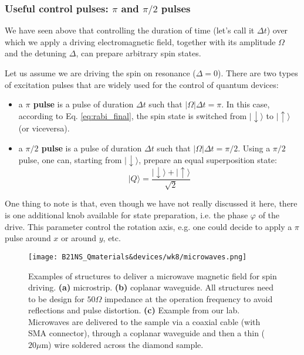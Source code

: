 \documentclass[a4paper,11pt]{article}
\newcommand{\ket}[1]{| #1 \rangle}
\begin{document}
\subsubsection{Useful control pulses: $\pi$ and $\pi/2$ pulses}
We have seen above that controlling the duration of time (let's call it $\Delta t$) over which we apply a driving electromagnetic field, together with its amplitude $\Omega$ and the detuning $\Delta$, can prepare arbitrary spin states.

Let us assume we are driving the spin on resonance ($\Delta = 0$). There are two types of excitation pulses that are widely used for the control of quantum devices:
\begin{itemize}
    \item a {\bf $\pi$ pulse} is a pulse of duration $\Delta t$ such that $|\Omega| \Delta t = \pi$. In this case, according to Eq. \ref{eq:rabi_final}, the spin state is switched from $\ket{\downarrow}$ to $\ket{\uparrow}$ (or viceversa).
    \item a {\bf $\pi/2$ pulse} is a pulse of duration $\Delta t$ such that $|\Omega| \Delta t = \pi/2$. Using a $\pi/2$ pulse, one can, starting from $\ket{\downarrow}$, prepare an equal superposition state:
    \begin{equation}
        \ket{Q} = \frac{\ket{\downarrow} + \ket{\uparrow}}{\sqrt{2}}
    \end{equation}
\end{itemize}

One thing to note is that, even though we have not really discussed it here, there is one additional knob available for state preparation, i.e. the phase $\varphi$ of the drive. This parameter control the rotation axis, e.g. one could decide to apply a $\pi$ pulse around $x$ or around $y$, etc.


\begin{figure}[h]
\centering
\texttt{[image: B21NS\_Qmaterials\&devices/wk8/microwaves.png]}
\caption{Examples of structures to deliver a microwave magnetic field for spin driving. {\bf (a)} microstrip. {\bf (b)} coplanar waveguide. All structures need to be design for $50 \Omega$ impedance at the operation frequency to avoid reflections and pulse distortion. {\bf (c)} Example from our lab. Microwaves are delivered to the sample via a coaxial cable (with SMA connector), through a coplanar waveguide and then a thin ($20 \mu$m) wire soldered across the diamond sample.}
\label{fig:MW}
\end{figure}
\end{document}
